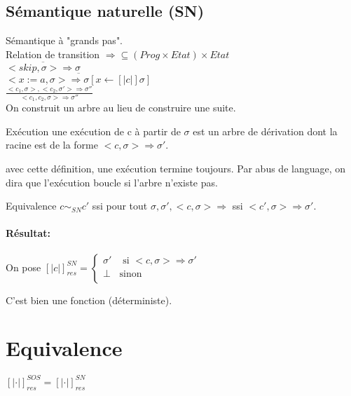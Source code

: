 \documentclass[10pt,a4paper]{article}
\newcommand{\semm}[1]{\left[| #1 | \right]}
\begin{document}
 \subsection{Sémantique naturelle (SN)}
 
 Sémantique à "grands pas".\\
 Relation de transition $\Rightarrow \subseteq (Prog \times Etat) \times Etat$\\
$\overline{ <skip, \sigma > \Rightarrow \sigma }$\\
$\overline{  <x:=a , \sigma > \Rightarrow \sigma [ x \leftarrow \semm{c } \sigma ] }$\\
$\frac{ <c_1, \sigma > , <c_2 , \sigma' > \Rightarrow \sigma'' }{<c_1, c_2, \sigma > \Rightarrow \sigma''}$\\

On construit un arbre au lieu de construire une suite.
\begin{definition}{Exécution}
une exécution de c à partir de $\sigma$ est un arbre de dérivation dont la racine est de la forme $<c, \sigma > \Rightarrow \sigma'$.\\
\end{definition} 
\begin{rem}{}
avec cette définition, une exécution termine toujours. Par abus de language, on dira que l'exécution boucle si l'arbre n'existe pas.
\end{rem}
\begin{definition}{Equivalence}
 $c \sim_{SN} c'$ ssi pour tout $\sigma, \sigma', < c, \sigma > \Rightarrow$ ssi $<c', \sigma > \Rightarrow \sigma'$.\\
\end{definition} 


\paragraph*{Résultat:}
On pose $\semm{c}_{res}^{SN} = \left\{ \begin{array}{ll}
 \sigma' &\text{ si } <c, \sigma > \Rightarrow \sigma' \\
 \perp & \text{sinon} \\
\end{array} \right.$

\begin{thm}{} C'est bien une fonction (déterministe).\\
\end{thm}

\section{Equivalence}
\begin{thm}{} $ \semm{ \cdot }_{res}^{SOS} = \semm{ \cdot }_{res}^{SN}$\\
\end{thm}
\end{document}
